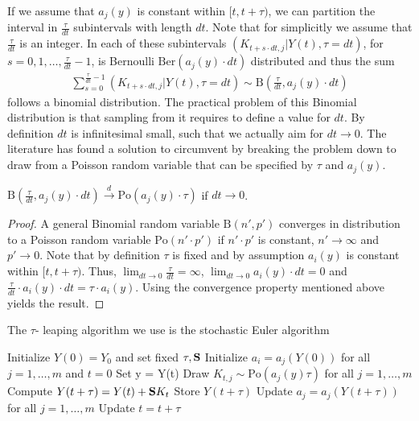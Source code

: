 If we assume that $a_j(y)$ is constant within $[t, t+\tau)$, we can partition the interval in $\frac{\tau}{dt}$ subintervals with length $dt$. Note that for simplicitly we assume that $\frac{\tau}{dt}$ is an integer. In each of these subintervals $\left(K_{t+s \cdot dt,j}|Y(t), \tau =dt\right)$, for $s=0, 1, \dots, \frac{\tau}{dt} - 1$, is Bernoulli $\mathrm{Ber}(a_j(y) \cdot dt)$ distributed and thus the sum
\begin{align*}
\sum_{s=0}^{\frac{\tau}{dt}-1} \left(K_{t+s \cdot dt, j} | Y(t), \tau = dt\right) \sim \textrm{B}\left(\frac{\tau}{dt}, a_j(y) \cdot dt\right)
\end{align*}
follows a binomial distribution. The practical problem of this Binomial distribution is that sampling from it requires to define a value for $dt$. By definition $dt$ is infinitesimal small, such that we actually aim for $dt \to 0$. The literature has found a solution to circumvent by breaking the problem down to draw from a Poisson random variable that can be specified by $\tau$ and $a_j(y)$.
\begin{theorem}
$\textrm{B}\left(\frac{\tau}{dt}, a_j(y) \cdot dt\right) \xrightarrow{d} \textrm{Po}(a_j(y) \cdot \tau)$ if $dt \to 0$.
\end{theorem}
\begin{proof}
A general Binomial random variable $\textrm{B}(n'
,p')$ converges in distribution to a Poisson random variable $\textrm{Po}(n' \cdot p')$ if $n' \cdot p'$ is constant, $n' \to \infty$ and $p' \to 0$. Note that by definition $\tau$ is fixed and by assumption $a_i(y)$ is constant within $[t, t+\tau)$. Thus, $\lim_{dt \to 0} \frac{\tau}{dt} = \infty$, $\lim_{dt \to 0} a_i(y) \cdot dt = 0$ and $\frac{\tau}{dt} \cdot a_i(y) \cdot dt = \tau \cdot a_i(y)$. Using the convergence property mentioned above yields the result.
\end{proof}
The $\tau$- leaping algorithm we use is the stochastic Euler algorithm
\begin{algorithm}[H]
\begin{algorithmic}[1]
%
\STATE Initialize $Y(0) = Y_0$ and set fixed $\tau, \mathbf{S}$
\STATE Initialize $a_i = a_j(Y(0))$ for all $j = 1, \dots, m$ and $t = 0$
\STATE Set y = Y(t)
\STATE Draw $K_{t,j} \sim \text{Po}(a_j(y) \tau ) $ for all $j = 1, \dots, m$
\STATE Compute $Y(t+\tau) = Y(t) + \mathbf{S} K_t$
\STATE Store $Y(t+\tau)$
\STATE Update $a_j = a_j(Y(t + \tau))$ for all $j = 1, \dots, m$
\STATE Update $t = t + \tau$
\ENDFOR
\end{algorithmic}

\label{alg:seq}
\end{algorithm}
